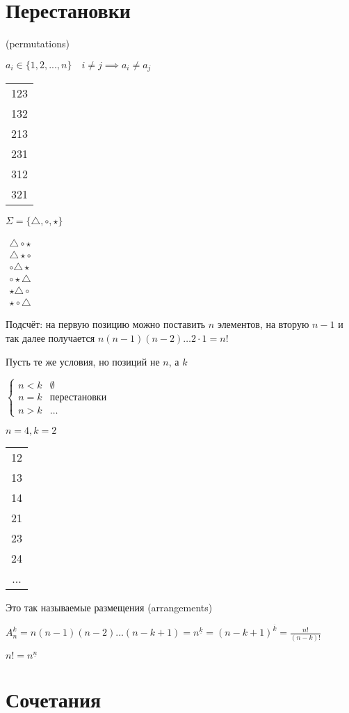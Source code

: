 \documentclass{book}
\renewcommand\O{\ensuremath{\emptyset}}
\theoremstyle{definition}
\begin{document}
\section{Перестановки}
(permutations)

$a_i\in\{1, 2, ..., n\}\quad i\neq j\implies a_i\neq a_j$

\begin{tabular}{c}
    123\\132\\213\\231\\312\\321\\
\end{tabular}

$\Sigma = \{\triangle, \circ, \star\}$ 

$\begin{array}{c}
    \triangle\circ\star\\
    \triangle\star\circ\\
    \circ\triangle\star\\
    \circ\star\triangle\\
    \star\triangle\circ\\
    \star\circ\triangle
\end{array}$

Подсчёт: на первую позицию можно поставить $n$ элементов, на вторую  $n-1$ и так далее получается $n(n-1)(n-2)\ldots 2 \cdot 1 = n!$

Пусть те же условия, но позиций не $n$, а  $k$

$\begin{cases}
    n<k&\O \\
    n=k&\text{перестановки} \\
    n>k&\ldots
\end{cases}$ 

$n=4, k=2$
\begin{tabular}{c}
    12\\13\\14\\21\\23\\24\\...
\end{tabular}

Это так называемые размещения (arrangements)

$A_n^k = n(n-1)(n-2)\ldots (n-k+1) = n^{\underline{k}} = (n-k+1)^{\overline{k}} = \frac{n!}{(n-k)!}$

$n! = n^{\underline{n}}$
\section{Сочетания}
\end{document}

